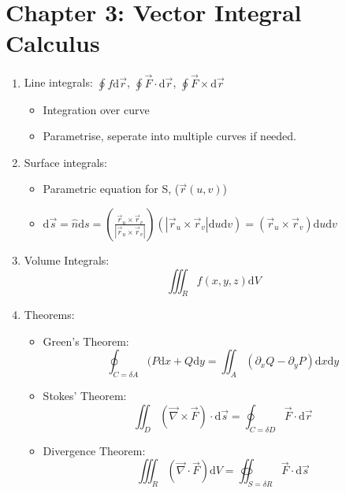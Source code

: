 \documentclass{article}
\begin{document}
\section{Chapter 3: Vector Integral Calculus}
\begin{enumerate}
\item Line integrals: $\oint f \mathrm{d}\vec{r}$, $\oint \vec{F}\cdot\mathrm{d}\vec{r}$, $\oint\vec{F}\times\mathrm{d}\vec{r}$
\begin{itemize}
\item Integration over curve
\item Parametrise, seperate into multiple curves if needed.
\end{itemize}
\item Surface integrals:
\begin{itemize}
\item Parametric equation for S, ($\vec{r}(u, v)$)
\item $\mathrm{d}\vec{s} = \hat{n}\mathrm{d}s = \left(\frac{\vec{r}_u\times\vec{r}_v}{|\vec{r}_u\times\vec{r}_v|}\right)(|\vec{r}_u\times\vec{r}_v|\mathrm{d}u\mathrm{d}v)=(\vec{r}_u\times\vec{r}_v)\mathrm{d}u\mathrm{d}v$
\end{itemize}
\item Volume Integrals:
\begin{equation}
\iiint_Rf(x,y,z)\mathrm{d}V
\end{equation}
\item Theorems:
\begin{itemize}
\item Green's Theorem:
\begin{equation}
\oint_{C=\delta A}(P\mathrm{d}x + Q\mathrm{d}y = \iint_A(\partial_xQ - \partial_yP)\mathrm{d}x\mathrm{d}y
\end{equation}
\item Stokes' Theorem:
\begin{equation}
\iint_D(\vec{\nabla}\times\vec{F})\cdot\mathrm{d}\vec{s} = \oint_{C=\delta D}\vec{F}\cdot\mathrm{d}\vec{r}
\end{equation}
\item Divergence Theorem:
\begin{equation}
\iiint_R(\vec{\nabla}\cdot\vec{F})\mathrm{d}V = \oiint_{S=\delta R}\vec{F}\cdot\mathrm{d}\vec{s}
\end{equation}
\end{itemize}
\end{enumerate}
\newpage
\end{document}
